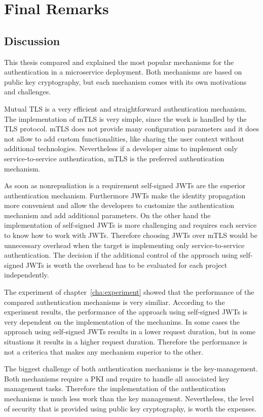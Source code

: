 \chapter{Final Remarks}
\label{cha:final_remarks}

\section{Discussion}
This thesis compared and explained the most popular mechanisms for the authentication in a microservice deployment.
Both mechanisms are based on public key cryptography, but each mechanism comes with its own motivations and challenges.

Mutual TLS is a very efficient and straightforward authentication mechanism.
The implementation of mTLS is very simple, since the work is handled by the TLS protocol.
mTLS does not provide many configuration parameters and it does not allow to add custom functionalities, like sharing the user context without additional technologies.
Nevertheless if a developer aims to implement only service-to-service authentication, mTLS is the preferred authentication mechanism.

As soon as nonrepudiation is a requirement self-signed JWTs are the superior authentication mechanism.
Furthermore JWTs make the identity propagation more convenient and allow the developers to customize the authentication mechanism and add additional parameters.
On the other hand the implementation of self-signed JWTs is more challenging and requires each service to know how to work with JWTs.
Therefore choosing JWTs over mTLS would be unnecessary overhead when the target is implementing only service-to-service authentication.
The decision if the additional control of the approach using self-signed JWTs is worth the overhead has to be evaluated for each project independently.

The experiment of chapter~\ref{cha:experiment} showed that the performance of the compared authentication mechanisms is very similiar.
According to the experiment results, the performance of the approach using self-signed JWTs is very dependent on the implementation of the mechanims.
In some cases the approach using self-signed JWTs results in a lower request duration, but in some situations it results in a higher request duration.
Therefore the performance is not a criterica that makes any mechanism superior to the other.

The biggest challenge of both authentication mechanisms is the key-management.
Both mechanisms require a PKI and require to handle all associated key management tasks.
Therefore the implementation of the authentication mechanisms is much less work than the key management.
Nevertheless, the level of security that is provided using public key cryptography, is worth the expenses.

